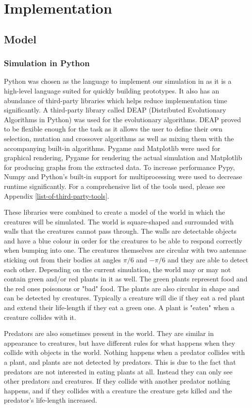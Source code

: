 \documentclass[a4paper,11pt]{kth-mag}
\begin{document}
\chapter{Implementation}
\section{Model}
\subsection{Simulation in Python}

Python was chosen as the language to implement our simulation in as it is a high-level language suited for quickly building prototypes. It also has an abundance of third-party libraries which helps reduce implementation time significantly. A third-party library called DEAP (Distributed Evolutionary Algorithms in Python) was used for the evolutionary algorithms. DEAP proved to be flexible enough for the task as it allows the user to define their own selection, mutation and crossover algorithms as well as mixing them with the accompanying built-in algorithms. Pygame and Matplotlib were used for graphical rendering, Pygame for rendering the actual simulation and Matplotlib for producing graphs from the extracted data. To increase performance Pypy, Numpy and Python's built-in support for multiprocessing were used to decrease runtime significantly. For a comprehensive list of the tools used, please see Appendix \ref{list-of-third-party-tools}.

These libraries were combined to create a model of the world in which the creatures will be simulated. The world is square-shaped and surrounded with walls that the creatures cannot pass through. The walls are detectable objects and have a blue colour in order for the creatures to be able to respond correctly when bumping into one. The creatures themselves are circular with two antennae sticking out from their bodies at angles $\pi /6$ and $-\pi/6$ and they are able to detect each other. Depending on the current simulation, the world may or may not contain green and/or red plants in it as well. The green plants represent food and the red ones poisonous or "bad" food. The plants are also circular in shape and can be detected by creatures. Typically a creature will die if they eat a red plant and extend their life-length if they eat a green one. A plant is "eaten" when a creature collides with it.

Predators are also sometimes present in the world. They are similar in appearance to creatures, but have different rules for what happens when they collide with objects in the world. Nothing happens when a predator collides with a plant, and plants are not detected by predators. This is due to the fact that predators are not interested in eating plants at all. Instead they can only see other predators and creatures. If they collide with another predator nothing happens, and if they collides with a creature the creature gets killed and the predator's life-length increased.
\end{document}
